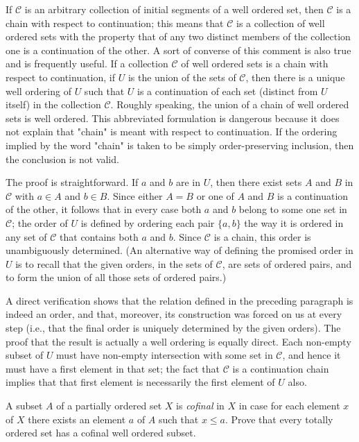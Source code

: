 If $\mathcal{C}$ is an arbitrary collection of initial segments of a well ordered set, then $\mathcal{C}$ is a chain with respect to continuation; this means that $\mathcal{C}$ is a collection of well ordered sets with the property that of any two distinct members of the collection one is a continuation of the other. A sort of converse of this comment is also true and is frequently useful. If a collection $\mathcal{C}$ of well ordered sets is a chain with respect to continuation, if $U$ is the union of the sets of $\mathcal{C}$, then there is a unique well ordering of $U$ such that $U$ is a continuation of each set (distinct from $U$ itself) in the collection $\mathcal{C}$. Roughly speaking, the union of a chain of well ordered sets is well ordered. This abbreviated formulation is dangerous because it does not explain that "chain" is meant with respect to continuation. If the ordering implied by the word "chain" is taken to be simply order-preserving inclusion, then the conclusion is not valid. 

The proof is straightforward. If $a$ and $b$ are in $U$, then there exist sets $A$ and $B$ in $\mathcal{C}$ with $a \in A$ and $b \in B$. Since either $A = B$ or one of $A$ and $B$ is a continuation of the other, it follows that in every case both $a$ and $b$ belong to some one set in $\mathcal{C}$; the order of $U$ is defined by ordering each pair $\{ a,b \}$ the way it is ordered in any set of $\mathcal{C}$ that contains both $a$ and $b$. Since $\mathcal{C}$ is a chain, this order is unambiguously determined. (An alternative way of defining the promised order in $U$ is to recall that the given orders, in the sets of $\mathcal{C}$, are sets of ordered pairs, and to form the union of all those sets of ordered pairs.) 

A direct verification shows that the relation defined in the preceding paragraph is indeed an order, and that, moreover, its  construction was forced on us at every step (i.e., that the final order is uniquely determined by the given orders). The proof that the result is actually a well ordering is equally direct. Each non-empty subset of $U$ must have non-empty intersection with some set in $\mathcal{C}$, and hence it must have a first element in that set; the fact that $\mathcal{C}$ is a continuation chain implies that that first element is necessarily the first element of $U$ also. 

\begin{exercise} A subset $A$ of a partially ordered set $X$ is \textit{cofinal} in $X$ in case for each element $x$ of $X$ there exists an element $a$ of $A$ such that $x \le a$. Prove that every totally ordered set has a cofinal well ordered subset.
\end{exercise}

